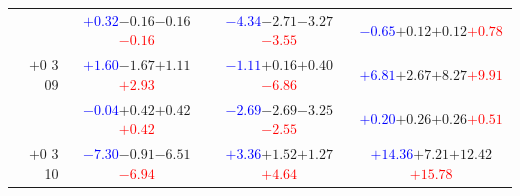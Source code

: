 \documentclass[compress]{beamer}
\begin{document}
\begin{frame}
\begin{tabular}{r | c | c | c}
          & \textcolor{blue}{$+0.32$}\hspace{0.1 cm}$-0.16$\hspace{0.1 cm}$-0.16$\hspace{0.1 cm}\textcolor{red}{$-0.16$} & \textcolor{blue}{$-4.34$}\hspace{0.1 cm}$-2.71$\hspace{0.1 cm}$-3.27$\hspace{0.1 cm}\textcolor{red}{$-3.55$} & \textcolor{blue}{$-0.65$}\hspace{0.1 cm}$+0.12$\hspace{0.1 cm}$+0.12$\hspace{0.1 cm}\textcolor{red}{$+0.78$} \\
$+$0 3 09 & \textcolor{blue}{$+1.60$}\hspace{0.1 cm}$-1.67$\hspace{0.1 cm}$+1.11$\hspace{0.1 cm}\textcolor{red}{$+2.93$} & \textcolor{blue}{$-1.11$}\hspace{0.1 cm}$+0.16$\hspace{0.1 cm}$+0.40$\hspace{0.1 cm}\textcolor{red}{$-6.86$} & \textcolor{blue}{$+6.81$}\hspace{0.1 cm}$+2.67$\hspace{0.1 cm}$+8.27$\hspace{0.1 cm}\textcolor{red}{$+9.91$} \\
          & \textcolor{blue}{$-0.04$}\hspace{0.1 cm}$+0.42$\hspace{0.1 cm}$+0.42$\hspace{0.1 cm}\textcolor{red}{$+0.42$} & \textcolor{blue}{$-2.69$}\hspace{0.1 cm}$-2.69$\hspace{0.1 cm}$-3.25$\hspace{0.1 cm}\textcolor{red}{$-2.55$} & \textcolor{blue}{$+0.20$}\hspace{0.1 cm}$+0.26$\hspace{0.1 cm}$+0.26$\hspace{0.1 cm}\textcolor{red}{$+0.51$} \\
$+$0 3 10 & \textcolor{blue}{$-7.30$}\hspace{0.1 cm}$-0.91$\hspace{0.1 cm}$-6.51$\hspace{0.1 cm}\textcolor{red}{$-6.94$} & \textcolor{blue}{$+3.36$}\hspace{0.1 cm}$+1.52$\hspace{0.1 cm}$+1.27$\hspace{0.1 cm}\textcolor{red}{$+4.64$} & \textcolor{blue}{$+14.36$}\hspace{0.1 cm}$+7.21$\hspace{0.1 cm}$+12.42$\hspace{0.1 cm}\textcolor{red}{$+15.78$} \\

\end{tabular}
\end{frame}
\end{document}
